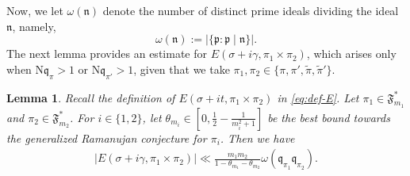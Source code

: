 \documentclass[12pt,reqno]{amsart}
\renewcommand{\tilde}{\widetilde}
\newtheorem{lem}[thm]{Lemma}
\theoremstyle{remark}
\renewcommand{\tilde}{\widetilde}
\DeclareMathOperator{\Real}{Re}
\DeclareMathOperator{\Imag}{Im}
\renewcommand{\tilde}{\widetilde}
\newcommand{\N}{\mathrm{N}}
\newcommand{\kp}{\mathfrak{p}}
\newcommand{\kq}{\mathfrak{q}}
\newcommand{\kn}{\mathfrak{n}}
\numberwithin{equation}{section}
\begin{document}
    Now, we let $\omega(\kn)$ denote the number of distinct prime ideals dividing the ideal $\kn$, namely,
    \[
     \omega(\kn) := | \{ \kp :  \kp \mid \kn\} |.
    \]
    The next lemma provides an estimate for $E(\sigma+i\gamma, \pi_1 \times \pi_2)$, which arises only when $\N\kq_{\pi}>1$ or $\N\kq_{\pi'}>1$, given that we take $\pi_1, \pi_2 \in \{\pi,\pi',\tilde{\pi},\tilde{\pi}'\}$. 
    
    \begin{lem}\label{lem:general-error}
		Recall the definition of $E(\sigma+it, \pi_1 \times \pi_2)$ in \eqref{eq:def-E}. Let $\pi_1 \in \mathfrak{F}_{m_1}^*$ and $\pi_2 \in \mathfrak{F}_{m_2}^*$.%
        For $i \in\{1,2\}$, let $\theta_{m_i} \in[0,\frac{1}{2}-\frac{1}{m_i^2+1}]$ be the best bound towards the generalized Ramanujan conjecture for $\pi_i$. Then we have 
		\begin{equation*}%
			\begin{aligned}
				|E(\sigma+ i\gamma, \pi_1\times \pi_2)|
				\ll \frac{m_1m_2}{1-\theta_{m_1}-\theta_{m_2}}\omega(\kq_{\pi_1}\kq_{\pi_2}).%
			\end{aligned}
		\end{equation*}
	\end{lem}
	
\end{document}
